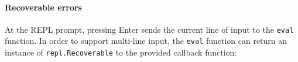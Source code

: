 \begin{Shaded}
\begin{Highlighting}[]
\OperatorTok{=} \NormalTok{(}\NormalTok{)}\OperatorTok{;}
\OperatorTok{=} \NormalTok{(}\NormalTok{)}\OperatorTok{;}

\OperatorTok{=}  \NormalTok{(}\OperatorTok{,} \NormalTok{)}\OperatorTok{;}

 \OperatorTok{,}\OperatorTok{,}\OperatorTok{,}
  \NormalTok{(}\OperatorTok{,}\OperatorTok{;}
\NormalTok{\}}

\NormalTok{(\{ }\OperatorTok{:} \StringTok{\textquotesingle{}\textgreater{} \textquotesingle{}}\OperatorTok{,} \OperatorTok{:}\OperatorTok{;}
\end{Highlighting}
\end{Shaded}

\paragraph{Recoverable errors}\label{recoverable-errors}

At the REPL prompt, pressing Enter sends the current line of input to
the \texttt{eval} function. In order to support multi-line input, the
\texttt{eval} function can return an instance of
\texttt{repl.Recoverable} to the provided callback function:

